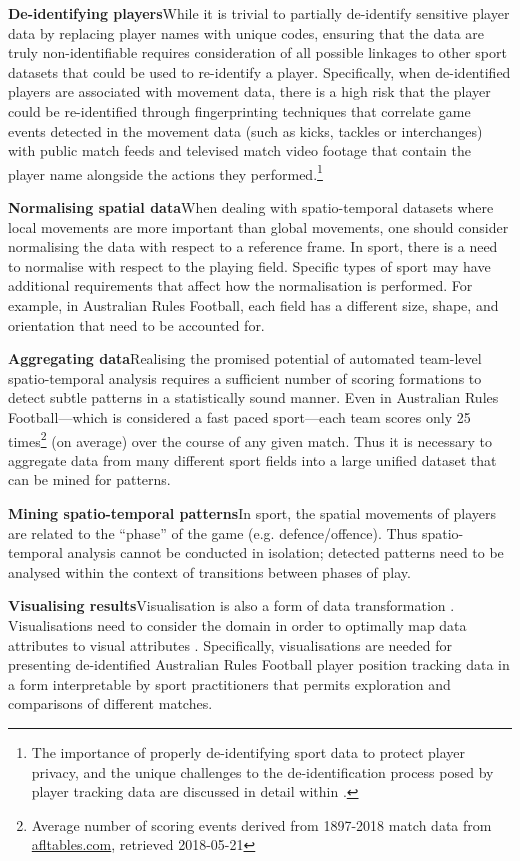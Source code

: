 \textbf{De-identifying players}\hs While it is trivial to partially de-identify sensitive player data by replacing player names with unique codes, ensuring that the data are truly non-identifiable requires consideration of all possible linkages to other sport datasets that could be used to re-identify a player. Specifically, when de-identified players are associated with movement data, there is a high risk that the player could be re-identified through fingerprinting techniques that correlate game events detected in the movement data (such as kicks, tackles or interchanges) with public match feeds and televised match video footage that contain the player name alongside the actions they performed.\footnote{The importance of properly de-identifying sport data to protect player privacy, and the unique challenges to the de-identification process posed by player tracking data are discussed in detail within .}

\textbf{Normalising spatial data}\hs When dealing with spatio-temporal datasets where local movements are more important than global movements, one should consider normalising the data with respect to a reference frame. In sport, there is a need to normalise with respect to the playing field. Specific types of sport may have additional requirements that affect how the normalisation is performed. For example, in Australian Rules Football, each field has a different size, shape, and orientation that need to be accounted for.

\textbf{Aggregating data}\hs Realising the promised potential of automated team-level spatio-temporal analysis requires a sufficient number of scoring formations to detect subtle patterns in a statistically sound manner. Even in Australian Rules Football---which is considered a fast paced sport---each team scores only 25 times\footnote{Average number of scoring events derived from 1897-2018 match data from \url{afltables.com}, retrieved 2018-05-21} (on average) over the course of any given match. Thus it is necessary to aggregate data from many different sport fields into a large unified dataset that can be mined for patterns.

\textbf{Mining spatio-temporal patterns}\hs In sport, the spatial movements of players are related to the ``phase'' of the game (e.g. defence/offence). Thus spatio-temporal analysis cannot be conducted in isolation; detected patterns need to be analysed within the context of transitions between phases of play.

\textbf{Visualising results}\hs Visualisation is also a form of data transformation \cite{Jankun-Kelly2007}. Visualisations need to consider the domain in order to optimally map data attributes to visual attributes \cite{Moody2009}. Specifically, visualisations are needed for presenting de-identified Australian Rules Football player position tracking data in a form interpretable by sport practitioners that permits exploration and comparisons of different matches.

